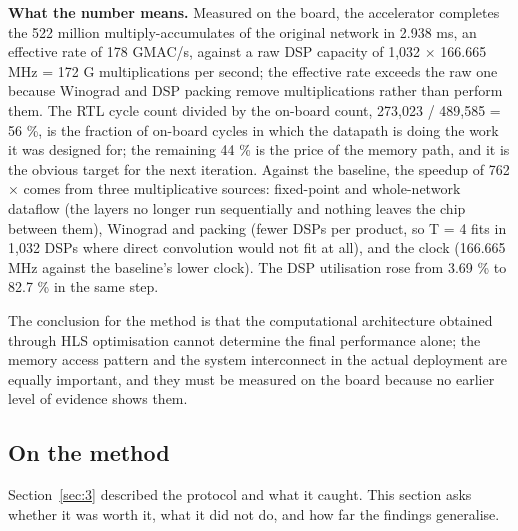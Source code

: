 \textbf{What the number means.} Measured on the board, the accelerator completes the 522 million multiply-accumulates of the original network in 2.938 ms, an effective rate of 178 GMAC/s, against a raw DSP capacity of 1,032 $\times$ 166.665 MHz = 172 G multiplications per second; the effective rate exceeds the raw one because Winograd and DSP packing remove multiplications rather than perform them. The RTL cycle count divided by the on-board count, 273,023 / 489,585 = 56 \%, is the fraction of on-board cycles in which the datapath is doing the work it was designed for; the remaining 44 \% is the price of the memory path, and it is the obvious target for the next iteration. Against the baseline, the speedup of 762$\times$ comes from three multiplicative sources: fixed-point and whole-network dataflow (the layers no longer run sequentially and nothing leaves the chip between them), Winograd and packing (fewer DSPs per product, so T = 4 fits in 1,032 DSPs where direct convolution would not fit at all), and the clock (166.665 MHz against the baseline's lower clock). The DSP utilisation rose from 3.69 \% to 82.7 \% in the same step.

The conclusion for the method is that the computational architecture obtained through HLS optimisation cannot determine the final performance alone; the memory access pattern and the system interconnect in the actual deployment are equally important, and they must be measured on the board because no earlier level of evidence shows them.

\subsection{On the method}\label{sec:6.4}

Section~\ref{sec:3} described the protocol and what it caught. This section asks whether it was worth it, what it did not do, and how far the findings generalise.

